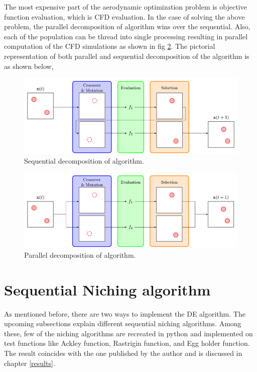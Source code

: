 The most expensive part of the aerodynamic optimization problem is objective function evaluation, which is CFD evaluation. In the case of solving the above problem, the parallel decomposition of algorithm wins over the sequential. Also, each of the population can be thread into single processing resulting in parallel computation of the CFD simulations as shown in fig \ref{parallel_form_algo}. The pictorial representation of both parallel and sequential decomposition of the algorithm is as shown below,
\begin{figure}[!ht]
    \centering
    \includegraphics[scale = 0.5]{figures/sequential_form_DE.png}
    \caption{Sequential decomposition of algorithm\cite{Poole2}.}
    \label{sequential_form_algo}
\end{figure}

\begin{figure}[!ht]
    \centering
    \includegraphics[scale = 0.5]{figures/parallel_form_DE.png}
    \caption{Parallel decomposition of algorithm\cite{Poole2}.}
    \label{parallel_form_algo}
\end{figure}

\section{Sequential Niching algorithm}
As mentioned before, there are two ways to implement the DE algorithm. The upcoming subsections explain different sequential niching algorithms. Among these, few of the niching algorithms are recreated in python and implemented on test functions like Ackley function, Rastrigin function, and Egg holder function. The result coincides with the one published by the author and is discussed in chapter \ref{results}. 

